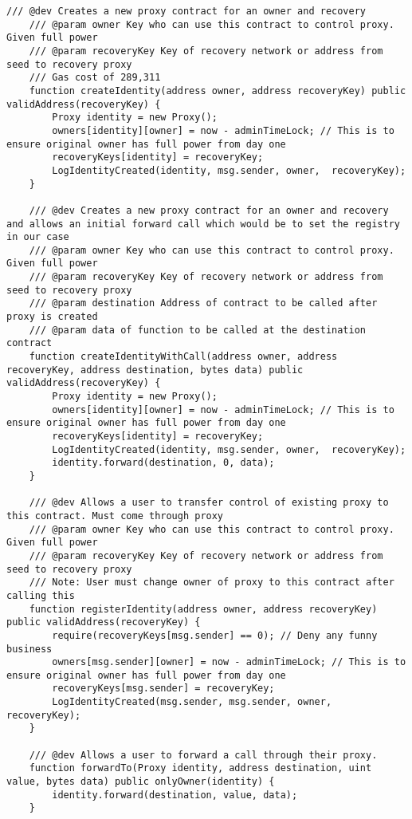 \begin{itemize}
\begin{lstlisting}[language=Solidity]
    /// @dev Creates a new proxy contract for an owner and recovery
    /// @param owner Key who can use this contract to control proxy. Given full power
    /// @param recoveryKey Key of recovery network or address from seed to recovery proxy
    /// Gas cost of 289,311
    function createIdentity(address owner, address recoveryKey) public validAddress(recoveryKey) {
        Proxy identity = new Proxy();
        owners[identity][owner] = now - adminTimeLock; // This is to ensure original owner has full power from day one
        recoveryKeys[identity] = recoveryKey;
        LogIdentityCreated(identity, msg.sender, owner,  recoveryKey);
    }

    /// @dev Creates a new proxy contract for an owner and recovery and allows an initial forward call which would be to set the registry in our case
    /// @param owner Key who can use this contract to control proxy. Given full power
    /// @param recoveryKey Key of recovery network or address from seed to recovery proxy
    /// @param destination Address of contract to be called after proxy is created
    /// @param data of function to be called at the destination contract
    function createIdentityWithCall(address owner, address recoveryKey, address destination, bytes data) public validAddress(recoveryKey) {
        Proxy identity = new Proxy();
        owners[identity][owner] = now - adminTimeLock; // This is to ensure original owner has full power from day one
        recoveryKeys[identity] = recoveryKey;
        LogIdentityCreated(identity, msg.sender, owner,  recoveryKey);
        identity.forward(destination, 0, data);
    }

    /// @dev Allows a user to transfer control of existing proxy to this contract. Must come through proxy
    /// @param owner Key who can use this contract to control proxy. Given full power
    /// @param recoveryKey Key of recovery network or address from seed to recovery proxy
    /// Note: User must change owner of proxy to this contract after calling this
    function registerIdentity(address owner, address recoveryKey) public validAddress(recoveryKey) {
        require(recoveryKeys[msg.sender] == 0); // Deny any funny business
        owners[msg.sender][owner] = now - adminTimeLock; // This is to ensure original owner has full power from day one
        recoveryKeys[msg.sender] = recoveryKey;
        LogIdentityCreated(msg.sender, msg.sender, owner, recoveryKey);
    }

    /// @dev Allows a user to forward a call through their proxy.
    function forwardTo(Proxy identity, address destination, uint value, bytes data) public onlyOwner(identity) {
        identity.forward(destination, value, data);
    }


\end{lstlisting}
\end{itemize}
